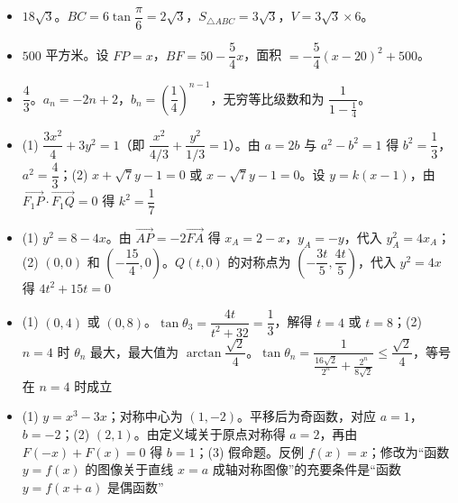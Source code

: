 \begin{itemize}[leftmargin=2.6em]
  \item[\textbf{25.}] $18\sqrt3$。$BC=6\tan\dfrac\pi6=2\sqrt3$，$S_{\triangle ABC}=3\sqrt3$，$V=3\sqrt3\times6$。
  \item[\textbf{26.}] $500$ 平方米。设 $FP=x$，$BF=50-\dfrac54x$，面积 $=-\dfrac54(x-20)^2+500$。
  \item[\textbf{27.}] $\dfrac43$。$a_n=-2n+2$，$b_n=\left(\dfrac14\right)^{n-1}$，无穷等比级数和为 $\dfrac{1}{1-\frac14}$。
  \item[\textbf{28.}] (1) $\dfrac{3x^2}{4}+3y^2=1$（即 $\dfrac{x^2}{4/3}+\dfrac{y^2}{1/3}=1$）。由 $a=2b$ 与 $a^2-b^2=1$ 得 $b^2=\dfrac13$，$a^2=\dfrac43$；(2) $x+\sqrt7y-1=0$ 或 $x-\sqrt7y-1=0$。设 $y=k(x-1)$，由 $\overrightarrow{F_1P}\cdot\overrightarrow{F_1Q}=0$ 得 $k^2=\dfrac17$
  \item[\textbf{29.}] (1) $y^2=8-4x$。由 $\overrightarrow{AP}=-2\overrightarrow{FA}$ 得 $x_A=2-x$，$y_A=-y$，代入 $y_A^2=4x_A$；(2) $(0,0)$ 和 $\left(-\dfrac{15}{4},0\right)$。$Q(t,0)$ 的对称点为 $\left(-\dfrac{3t}5,\dfrac{4t}5\right)$，代入 $y^2=4x$ 得 $4t^2+15t=0$
  \item[\textbf{30.}] (1) $(0,4)$ 或 $(0,8)$。$\tan\theta_3=\dfrac{4t}{t^2+32}=\dfrac13$，解得 $t=4$ 或 $t=8$；(2) $n=4$ 时 $\theta_n$ 最大，最大值为 $\arctan\dfrac{\sqrt2}{4}$。$\tan\theta_n=\dfrac{1}{\frac{16\sqrt2}{2^n}+\frac{2^n}{8\sqrt2}}\leqslant\dfrac{\sqrt2}{4}$，等号在 $n=4$ 时成立
  \item[\textbf{31.}] (1) $y=x^3-3x$；对称中心为 $(1,-2)$。平移后为奇函数，对应 $a=1$，$b=-2$；(2) $(2,1)$。由定义域关于原点对称得 $a=2$，再由 $F(-x)+F(x)=0$ 得 $b=1$；(3) 假命题。反例 $f(x)=x$；修改为“函数 $y=f(x)$ 的图像关于直线 $x=a$ 成轴对称图像”的充要条件是“函数 $y=f(x+a)$ 是偶函数”
\end{itemize}
